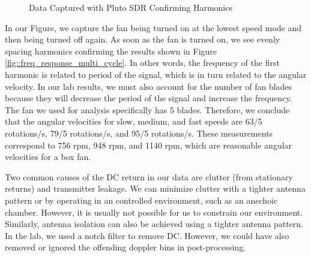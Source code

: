 \documentclass{article}
\begin{document}
\begin{figure}[H]
    	\centering
    	\caption{Data Captured with Pluto SDR Confirming Harmonics}
    	\label{fig::dopp_harmonics}
\end{figure}

\noindent In our Figure, we capture the fan being turned on at the lowest speed mode and then being turned off again. As soon as the fan is turned on, we see evenly spacing harmonics confirming the results shown in Figure \ref{fig::freq_response_multi_cycle}. In other words, the frequency of the first harmonic is related to period of the signal, which is in turn related to the angular velocity. In our lab results, we must also account for the number of fan blades because they will decrease the period of the signal and increase the frequency. The fan we used for analysis specifically has 5 blades. Therefore, we conclude that the angular velocities for slow, medium, and fast speeds are 63/5 rotations/s, 79/5 rotations/s, and 95/5 rotations/s. These measurements correspond to 756 rpm, 948 rpm, and 1140 rpm, which are reasonable angular velocities for a box fan.

Two common causes of the DC return in our data are clutter (from stationary returns) and transmitter leakage. We can minimize clutter with a tighter antenna pattern or by operating in an controlled environment, such as an anechoic chamber. However, it is usually not possible for us to constrain our environment. Similarly, antenna isolation can also be achieved using a tighter antenna pattern. In the lab, we used a notch filter to remove DC. However, we could have also removed or ignored the offending doppler bins in post-processing.

\end{document}
